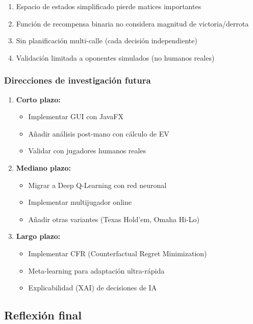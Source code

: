 \documentclass[12pt,a4paper]{article}
\begin{document}
\begin{enumerate}
    \item Espacio de estados simplificado pierde matices importantes
    \item Función de recompensa binaria no considera magnitud de victoria/derrota
    \item Sin planificación multi-calle (cada decisión independiente)
    \item Validación limitada a oponentes simulados (no humanos reales)
\end{enumerate}

\subsubsection{Direcciones de investigación futura}

\begin{enumerate}
    \item \textbf{Corto plazo:}
    \begin{itemize}
        \item Implementar GUI con JavaFX
        \item Añadir análisis post-mano con cálculo de EV
        \item Validar con jugadores humanos reales
    \end{itemize}
    
    \item \textbf{Mediano plazo:}
    \begin{itemize}
        \item Migrar a Deep Q-Learning con red neuronal
        \item Implementar multijugador online
        \item Añadir otras variantes (Texas Hold'em, Omaha Hi-Lo)
    \end{itemize}
    
    \item \textbf{Largo plazo:}
    \begin{itemize}
        \item Implementar CFR (Counterfactual Regret Minimization)
        \item Meta-learning para adaptación ultra-rápida
        \item Explicabilidad (XAI) de decisiones de IA
    \end{itemize}
\end{enumerate}

\subsection{Reflexión final}
\end{document}

